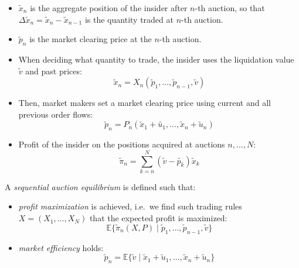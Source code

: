 \documentclass{beamer}
\begin{document}
\begin{frame}
    \begin{itemize}
        \item $\tilde{x}_n$ is the aggregate position of the insider after $n$-th auction, so that $\Delta \tilde{x}_n = \tilde{x}_n - \tilde{x}_{n-1}$ is the quantity traded at $n$-th auction.
        \item $\tilde{p}_n$ is the market clearing price at the $n$-th auction.
        \item When deciding what quantity to trade, the insider uses the liquidation value $\tilde{v}$ and past prices:
            \begin{equation}
                \tilde{x}_n = X_n(\tilde{p}_1, \ldots, \tilde{p}_{n-1}, \tilde{v})
            \end{equation}
        \item Then, market makers set a market clearing price using current and all previous order flows:
            \begin{equation}
                \tilde{p}_n = P_n(\tilde{x}_1 + \tilde{u_1}, \ldots, \tilde{x}_n + \tilde{u}_n)
            \end{equation}
        \item Profit of the insider on the positions acquired at auctions $n, \ldots, N$:
            \begin{equation}
                \tilde{\pi}_n = \sum_{k=n}^{N}(\tilde{v} - \tilde{p_k})\tilde{x}_k
            \end{equation}
    \end{itemize}
\end{frame}

\begin{frame}
    A \textit{sequential auction equilibrium} is defined such that:
    \begin{itemize}
        \item \textit{profit maximization} is achieved, i.e.~we find such trading rules $X=(X_1, \ldots, X_N)$ that the expected profit is maximized:
            \begin{equation}
                \mathbb{E}\{\tilde{\pi}_n(X, P) \mid \tilde{p}_1, \ldots, \tilde{p}_{n-1}, \tilde{v}\}
            \end{equation}
        \item \textit{market efficiency} holds:
            \begin{equation}
                \tilde{p}_n = \mathbb{E}\{\tilde{v} \mid \tilde{x}_1 + 
                \tilde{u}_1, \ldots, \tilde{x}_n + \tilde{u}_n\}
            \end{equation}
    \end{itemize}
\end{frame}
\end{document}
